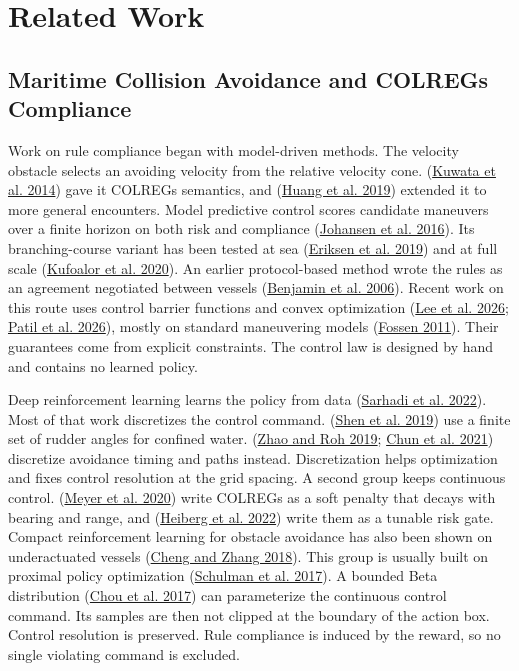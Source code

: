 \documentclass[10pt,letterpaper]{article}
\newcommand{\citl}[2]{(\hyperlink{ref:#1}{#2})}
\newcommand{\citm}[1]{(#1)}
\newcommand{\cl}[2]{\hyperlink{ref:#1}{#2}}
\begin{document}
\section{Related Work}
\label{sec:related}

\subsection{Maritime Collision Avoidance and COLREGs Compliance}

Work on rule compliance began with model-driven methods. The velocity obstacle selects an avoiding velocity from the relative velocity cone.
\citl{kuwata2014}{Kuwata et al. 2014} gave it COLREGs semantics, and
\citl{huang2019}{Huang et al. 2019} extended it to more general encounters. Model predictive control scores candidate
maneuvers over a finite horizon on both risk and compliance
\citl{johansen2016}{Johansen et al. 2016}. Its branching-course variant has been tested at
sea \citl{eriksen2019}{Eriksen et al. 2019} and at full scale
\citl{kufoalor2020}{Kufoalor et al. 2020}. An earlier protocol-based method wrote the rules
as an agreement negotiated between vessels
\citl{benjamin2006}{Benjamin et al. 2006}. Recent work on this route uses control barrier
functions and convex optimization \citm{\cl{lee2025}{Lee et al. 2026};
\cl{patil2026}{Patil et al. 2026}}, mostly on standard maneuvering models
\citl{fossen2011}{Fossen 2011}. Their guarantees come from explicit constraints. The control
law is designed by hand and contains no learned policy.

Deep reinforcement learning learns the policy from data \citl{sarhadi2022}{Sarhadi et
al. 2022}. Most of that work discretizes the control command. \citl{shen2019}{Shen et al. 2019} use
a finite set of rudder angles for confined water. \citm{\cl{zhao2019}{Zhao and Roh
2019}; \cl{chun2021}{Chun et al. 2021}} discretize avoidance timing and paths instead. Discretization
helps optimization and fixes control resolution at the grid spacing. A second group keeps continuous control. \citl{meyer2020}{Meyer et al. 2020} write
COLREGs as a soft penalty that decays with bearing and range, and
\citl{heiberg2022}{Heiberg et al. 2022} write them as a tunable risk gate. Compact reinforcement learning for obstacle
avoidance has also been shown on underactuated vessels \citl{cheng2018}{Cheng and Zhang 2018}. This group is usually built on proximal policy optimization \citl{schulman2017}{Schulman
et al. 2017}. A bounded Beta distribution \citl{chou2017}{Chou et al. 2017} can
parameterize the continuous control command. Its samples are then not clipped at the
boundary of the action box. Control resolution is preserved. Rule
compliance is induced by the reward, so no single violating command is excluded.
\end{document}

